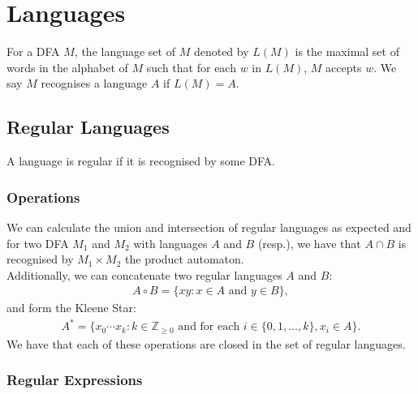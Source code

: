 \section{Languages}

For a DFA $M$, the language set of $M$ denoted by $L(M)$
is the maximal set of words in the alphabet of $M$ such that
for each $w$ in $L(M)$, $M$ accepts $w$. We say $M$ recognises
a language $A$ if $L(M) = A$.

\subsection{Regular Languages}

A language is regular if it is recognised by some DFA.

\subsubsection{Operations}

We can calculate the union and intersection of regular languages
as expected and for two DFA $M_1$ and $M_2$ with languages
$A$ and $B$ (resp.), we have that $A \cap B$ is
recognised by $M_1 \times M_2$ the product automaton.
\\[\baselineskip]
Additionally, we can concatenate two regular languages $A$ and
$B$: \begin{gather*}
    A \circ B = \{xy : x \in A \text{ and } y \in B\},
\end{gather*} and form the Kleene Star: \begin{gather*}
    A^* = \{x_0 \cdots x_k : k \in \mathbb{Z}_{\geq 0}
        \text{ and for each } i \in \{0, 1, \ldots, k\}, 
        x_i \in A\}.
\end{gather*} We have that each of these operations are closed
in the set of regular languages.

\subsubsection{Regular Expressions}

